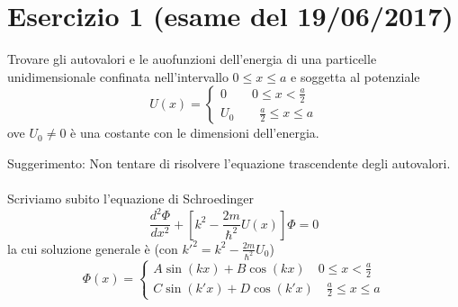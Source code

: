\documentclass[a4paper]{article}
\begin{document}
    \section*{Esercizio 1 (esame del 19/06/2017)}
        Trovare gli autovalori e le auofunzioni dell'energia di una particelle unidimensionale confinata nell'intervallo $0\leq x\leq a$ e soggetta al potenziale
        \begin{equation*}
            U(x)=
            \begin{cases}
                0\quad\quad 0\leq x <\frac{a}{2}\\
                U_0\quad\quad \frac{a}{2}\leq x \leq a
            \end{cases}
        \end{equation*}
        ove $U_0\neq 0$ è una costante con le dimensioni dell'energia.
        \begin{figure}[H]
            \centering
        \end{figure}
        Suggerimento: Non tentare di risolvere l'equazione trascendente degli autovalori.
        \\
        \\
        Scriviamo subito l'equazione di Schroedinger
        \begin{equation*}
            \frac{d^2\Phi}{dx^2}+\left[k^2-\frac{2m}{\hbar^2}U(x)\right]\Phi=0
        \end{equation*}
        la cui soluzione generale è (con $k'^2=k^2-\frac{2m}{\hbar^2}U_0$)
        \begin{equation*}
            \Phi(x)=
            \begin{cases}
                A\sin(kx)+B\cos(kx)\quad 0\leq x <\frac{a}{2}\\
                C\sin(k'x)+D\cos(k'x)\quad \frac{a}{2}\leq x \leq a
            \end{cases}
        \end{equation*}
\end{document}
